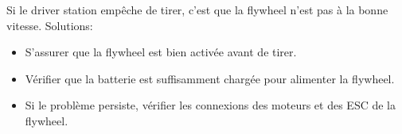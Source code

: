 \documentclass[12pt, a4paper]{report}
\begin{document}
    Si le driver station empêche de tirer, c'est que la flywheel n'est pas à la bonne vitesse. Solutions:
    \begin{itemize}
        \item S'assurer que la flywheel est bien activée avant de tirer.
        \item Vérifier que la batterie est suffisamment chargée pour alimenter la flywheel.
        \item Si le problème persiste, vérifier les connexions des moteurs et des ESC de la flywheel.
    \end{itemize}
\end{document}
